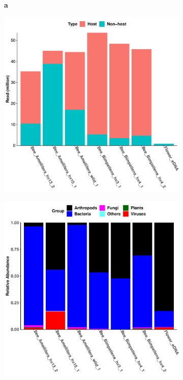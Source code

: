 \documentclass[11pt]{article}
\begin{document}
      \begin{figure}[H]
        \begin{subfigure}
          \centering
          \textbf{a}
        \end{subfigure}
        \hspace{0.5\linewidth}
        \begin{subfigure}
          \textbf{b}
        \end{subfigure}
        \newline
        \hfill
        \begin{subfigure}
          \centering
          \includegraphics[width=0.48\linewidth,height=0.48\linewidth]{../Figures/NonHostRatio.pdf}
        \end{subfigure}
        \hfill
        \begin{subfigure}
          \centering
          \includegraphics[width=0.48\linewidth,height=0.48\linewidth]{../Figures/1_species_RelAbundance_GroupAbundance.pdf}
        \end{subfigure}


\end{figure}
\end{document}
